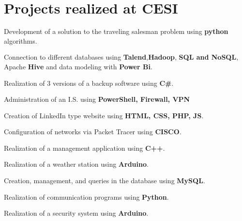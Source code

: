 \documentclass[a4paper,table]{twentysecondcv}
\begin{document}
\vspace{-0.4cm}

\section{Projects realized at CESI}

\vspace{-0.2cm}
\begin{twenty}

{}
{Development of a solution to the traveling salesman problem using \textbf{python} algorithms.}

{}
{Connection to different databases using \textbf{Talend},\textbf{Hadoop}, \textbf{SQL and NoSQL}, Apache \textbf{Hive} and data modeling with \textbf{Power Bi}.}

{}
{Realization of 3 versions of a backup software using \textbf{C\#}.}

{}
{Administration of an I.S. using \textbf{PowerShell, Firewall, VPN}}

{}
{Creation of LinkedIn type website using \textbf{HTML, CSS, PHP, JS}.}

{}
{Configuration of networks via Packet Tracer using \textbf{CISCO}.}

{}
{Realization of a management application using \textbf{C++}.}

{}
{Realization of a weather station using \textbf{Arduino}.}

{}
{Creation, management, and queries in the database using \textbf{MySQL}.}

{}
{Realization of communication programs using \textbf{Python}.}

{}
{Realization of a security system using \textbf{Arduino}.}

\end{twenty}
\end{document}
